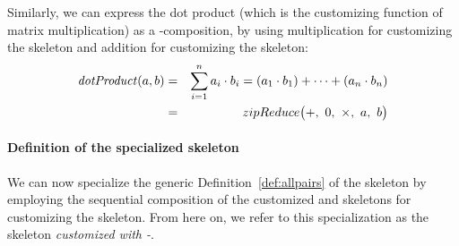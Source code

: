 Similarly, we can express the dot product (which is the customizing function of matrix multiplication) as a \zip-\reduce composition, by using multiplication for customizing the \zip skeleton and addition for customizing the \reduce skeleton:
\begin{eqnarray*}
  \mbox{\emph{dotProduct}}(a, b) &=& \sum_{i = 1}^{n} a_i \cdot b_i = (a_1 \cdot b_1) + \cdots + (a_n \cdot b_n)\\
  &=& zipReduce\big(+,\ 0,\ \times,\ a,\ b\big)
\end{eqnarray*}

\paragraph{Definition of the specialized \allpairs skeleton}

We can now specialize the generic Definition~\autoref{def:allpairs} of the \allpairs skeleton by employing the sequential composition of the customized \reduce and \zip skeletons for customizing the \allpairs skeleton.
From here on, we refer to this specialization as the \allpairs skeleton \emph{customized with \zip-\reduce}.

